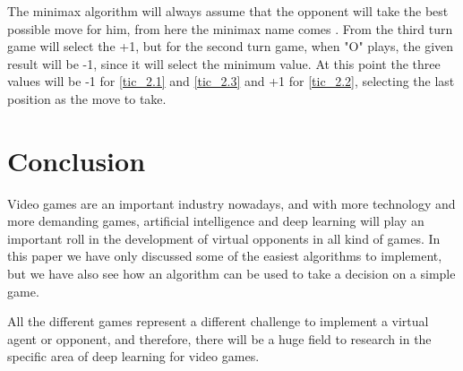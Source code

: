 \documentclass[conference]{IEEEtran}
\begin{document}
The minimax algorithm will always assume that the opponent will take the best possible move for him, from here the minimax name comes \cite{tictac}. From the third turn game will select the +1, but for the second turn game, when "O" plays, the given result will be -1, since it will select the minimum value. At this point the three values will be -1 for \ref{tic_2.1} and \ref{tic_2.3} and +1 for \ref{tic_2.2}, selecting the last position as the move to take.

\section{Conclusion}

Video games are an important industry nowadays, and with more technology and more demanding games, artificial intelligence and deep learning will play an important roll in the development of virtual opponents in all kind of games. In this paper we have only discussed some of the easiest algorithms to implement, but we have also see how an algorithm can be used to take a decision on a simple game.

All the different games represent a different challenge to implement a virtual agent or opponent, and therefore, there will be a huge field to research in the specific area of deep learning for video games.
\end{document}
